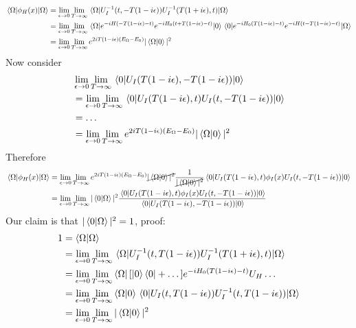 \begin{align}
    \mel{\Omega}{ \phi_H  (x) }{\Omega}  & =
      \lim_{\epsilon \to 0 } \lim_{T \to \infty} \mel{\Omega}{ U_{I}^{-1} (t, -T(1 - i\epsilon)) U_{I}^{-1} ( T(1 + i\epsilon)  , t )  }{\Omega} \nonumber\\
      & = \lim_{\epsilon \to 0 } \lim_{T \to \infty} \mel{\Omega}{ e^{-iH (-T (1 - i\epsilon) - t)}  e^{-iH_0 (t + T (1 - i\epsilon) - t)}  }{0} \mel{0}{e^{-iH_0 (T (1 - i\epsilon) - t)}  e^{-iH (t - T (1 - i\epsilon) - t)}}{\Omega} \nonumber\\
      & = \lim_{\epsilon \to 0 } \lim_{T \to \infty} e^{2i T(1 - i\epsilon)  (E_{\Omega}  - E_0) } |\expval{\Omega|0}|^2
\end{align}
Now consider 
\begin{align}
     & \lim_{\epsilon \to 0 } \lim_{T \to \infty} \mel{0}{ U_I (T (1-  i\epsilon)  , -T (1 - i\epsilon) ) }{0} \nonumber\\
     & = \lim_{\epsilon \to 0 } \lim_{T \to \infty} \mel{0}{ U_I (T (1-  i\epsilon)  ,t) U_I( t, -T (1 - i\epsilon) ) }{0} \nonumber\\
     & = \dots \nonumber\\
     &= \lim_{\epsilon \to 0 } \lim_{T \to \infty} e^{2i T(1 - i\epsilon)  (E_{\Omega}  - E_0) } |\expval{\Omega|0}|^2 
\end{align}
Therefore
\begin{align}
     \mel{\Omega}{  \phi_H (x) }{\Omega} & = 
      \lim_{\epsilon \to 0 } \lim_{T \to \infty} e^{2i T(1 - i\epsilon)  (E_{\Omega}  - E_0) }  \cancel{|\expval{\Omega|0}|^2} \frac{1}{\cancel{|\expval{\Omega|0}|^2}}  \mel{0}{U_{I} ( T(1 - i\epsilon) , t) \phi_I (x)  U_I (t, -T (1 - i\epsilon ))  }{0} \nonumber\\
     & =\lim_{\epsilon \to 0 } \lim_{T \to \infty}  |\expval{0|\Omega}|^2 \frac{ \mel{0}{U_{I} ( T(1 - i\epsilon) , t) \phi_I (x)  U_I (t, -T (1 - i\epsilon ))  }{0}}{\mel{0}{ U_I (T (1-  i\epsilon)  , -T (1 - i\epsilon) ) }{0}}
\end{align}
Our claim is that $|\expval{0| \Omega}|^2 = 1$, proof: 
\begin{align}
    1 & = \expval{\Omega | \Omega} \nonumber\\
    &  = \lim_{\epsilon \to 0 } \lim_{T \to \infty} \mel{\Omega}{ U_{I}^{-1} (t, T(1 - i\epsilon)) U_{I}^{-1} ( T(1 + i\epsilon)  , t )  }{\Omega} \nonumber\\
    & = \lim_{\epsilon \to 0 } \lim_{T \to \infty}  \bra{\Omega} [\ket{0} \bra{0} + \dots] e^{-iH_0  (T(1 - i\epsilon) - t) } U_H \dots \nonumber\\
    & = \lim_{\epsilon \to 0 } \lim_{T \to \infty} \expval{\Omega|0} \mel{0}{ U_{I} (t, T(1 - i\epsilon)) U_{I}^{-1} (t,  T(1 - i\epsilon) )  }{\Omega}\nonumber\\
    & = \lim_{\epsilon \to 0 } \lim_{T \to \infty}  |\expval{\Omega| 0}|^2
\end{align}
